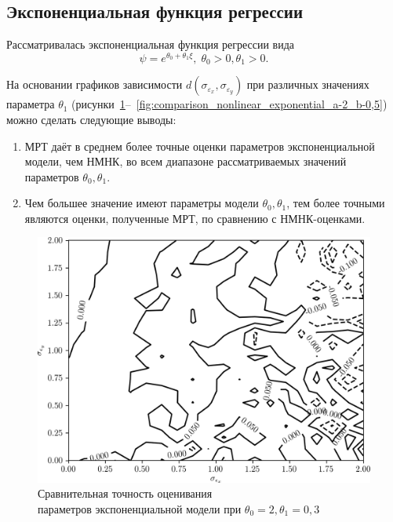 \vspace{2\baselineskip}
\subsection{Экспоненциальная функция регрессии}

Рассматривалась экспоненциальная функция регрессии вида
\[ \psi = e^{\theta_0 + \theta_1 \xi}, \; \theta_0 > 0, \theta_1 > 0. \]

На основании графиков зависимости \( d(\sigma_{\varepsilon_x}, \sigma_{\varepsilon_y}) \)
при различных значениях параметра \( \theta_1 \)
(рисунки~\ref{fig:comparison_nonlinear_exponential_a-2_b-0,3}--~\ref{fig:comparison_nonlinear_exponential_a-2_b-0,5}) можно сделать следующие выводы:
\begin{enumerate}
\item МРТ даёт в среднем более точные оценки параметров экспоненциальной модели, чем НМНК,
  во всем диапазоне рассматриваемых значений параметров \( \theta_0, \theta_1 \).
\item Чем большее значение имеют параметры модели \( \theta_0, \theta_1 \),
  тем более точными являются оценки, полученные МРТ, по сравнению с НМНК-оценками.
\end{enumerate}

\vspace{2\baselineskip}
\begin{figure}[h]
  \centering
  \includegraphics[width=135mm]{fig/nonlinear/exponential/a-2_b-0,3.png}
  \caption{
    Сравнительная точность оценивания \\
    параметров экспоненциальной модели при \( \theta_0 = 2, \theta_1 = 0{,}3 \)
  }\label{fig:comparison_nonlinear_exponential_a-2_b-0,3}
\end{figure}

